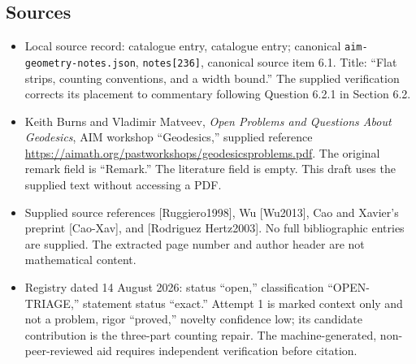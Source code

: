 \documentclass[11pt]{article}
\begin{document}
\subsection{Sources}
\begin{itemize}
\item Local source record: catalogue entry, catalogue entry; canonical \texttt{aim-geometry-notes.json}, \texttt{notes[236]}, canonical source item 6.1. Title: ``Flat strips, counting conventions, and a width bound.'' The supplied verification corrects its placement to commentary following Question 6.2.1 in Section 6.2.
\item Keith Burns and Vladimir Matveev, \emph{Open Problems and Questions About Geodesics}, AIM workshop ``Geodesics,'' supplied reference \url{https://aimath.org/pastworkshops/geodesicsproblems.pdf}. The original remark field is ``Remark.'' The literature field is empty. This draft uses the supplied text without accessing a PDF.
\item Supplied source references [Ruggiero1998], Wu [Wu2013], Cao and Xavier's preprint [Cao-Xav], and [Rodriguez Hertz2003]. No full bibliographic entries are supplied. The extracted page number and author header are not mathematical content.
\item Registry dated 14 August 2026: status ``open,'' classification ``OPEN-TRIAGE,'' statement status ``exact.'' Attempt 1 is marked context only and not a problem, rigor ``proved,'' novelty confidence low; its candidate contribution is the three-part counting repair. The machine-generated, non-peer-reviewed aid requires independent verification before citation.
\end{itemize}
\end{document}
